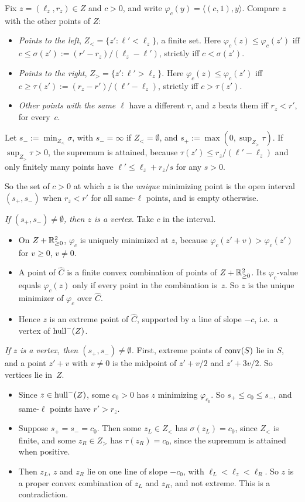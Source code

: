 Fix $z=(\ell_z,r_z)\in Z$ and $c>0$, and write $\varphi_c(y)=\langle(c,1),y\rangle$. Compare $z$ with the other points of $Z$:
\begin{itemize}
\item \emph{Points to the left}, $Z_<=\{z':\ell'<\ell_z\}$, a finite set. Here $\varphi_c(z)\le\varphi_c(z')$ iff $c\le\sigma(z'):=(r'-r_z)/(\ell_z-\ell')$, strictly iff $c<\sigma(z')$.
\item \emph{Points to the right}, $Z_>=\{z':\ell'>\ell_z\}$. Here $\varphi_c(z)\le\varphi_c(z')$ iff $c\ge\tau(z'):=(r_z-r')/(\ell'-\ell_z)$, strictly iff $c>\tau(z')$.
\item \emph{Other points with the same $\ell$} have a different $r$, and $z$ beats them iff $r_z<r'$, for every~$c$.
\end{itemize}
Let $s_-:=\min_{Z_<}\sigma$, with $s_-=\infty$ if $Z_<=\emptyset$, and $s_+:=\max(0,\sup_{Z_>}\tau)$. If $\sup_{Z_>}\tau>0$, the supremum is attained, because $\tau(z')\le r_z/(\ell'-\ell_z)$ and only finitely many points have $\ell'\le\ell_z+r_z/s$ for any $s>0$.

So the set of $c>0$ at which $z$ is the \emph{unique} minimizing point is the open interval $(s_+,s_-)$ when $r_z<r'$ for all same-$\ell$ points, and is empty otherwise.

\emph{If $(s_+,s_-)\neq\emptyset$, then $z$ is a vertex.} Take $c$ in the interval.
\begin{itemize}
\item On $Z+\mathbb{R}^2_{\ge0}$, $\varphi_c$ is uniquely minimized at $z$, because $\varphi_c(z'+v)>\varphi_c(z')$ for $v\geq0$, $v\neq0$.
\item A point of $\hat C$ is a finite convex combination of points of $Z+\mathbb{R}^2_{\ge0}$. Its $\varphi_c$-value equals $\varphi_c(z)$ only if every point in the combination is~$z$. So $z$ is the unique minimizer of $\varphi_c$ over $\hat C$.
\item Hence $z$ is an extreme point of $\hat C$, supported by a line of slope $-c$, i.e.\ a vertex of $\mathrm{hull}^{-}(Z)$.
\end{itemize}

\emph{If $z$ is a vertex, then $(s_+,s_-)\neq\emptyset$.} First, extreme points of $\mathrm{conv}(S)$ lie in $S$, and a point $z'+v$ with $v\neq0$ is the midpoint of $z'+v/2$ and $z'+3v/2$. So vertices lie in~$Z$.
\begin{itemize}
\item Since $z\in\mathrm{hull}^{-}(Z)$, some $c_0>0$ has $z$ minimizing $\varphi_{c_0}$. So $s_+\le c_0\le s_-$, and same-$\ell$ points have $r'>r_z$.
\item Suppose $s_+=s_-=c_0$. Then some $z_L\in Z_<$ has $\sigma(z_L)=c_0$, since $Z_<$ is finite, and some $z_R\in Z_>$ has $\tau(z_R)=c_0$, since the supremum is attained when positive.
\item Then $z_L$, $z$ and $z_R$ lie on one line of slope $-c_0$, with $\ell_L<\ell_z<\ell_R$. So $z$ is a proper convex combination of $z_L$ and $z_R$, and not extreme. This is a contradiction.
\end{itemize}

